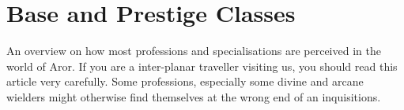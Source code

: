 \chapter{Base and Prestige Classes}
\label{sec:Classes}

An overview on how most professions and specialisations are perceived in the
world of Aror. If you are a inter-planar traveller visiting us, you should
read this article very carefully. Some professions, especially some divine
and arcane wielders might otherwise find themselves at the wrong end of an
inquisitions.


